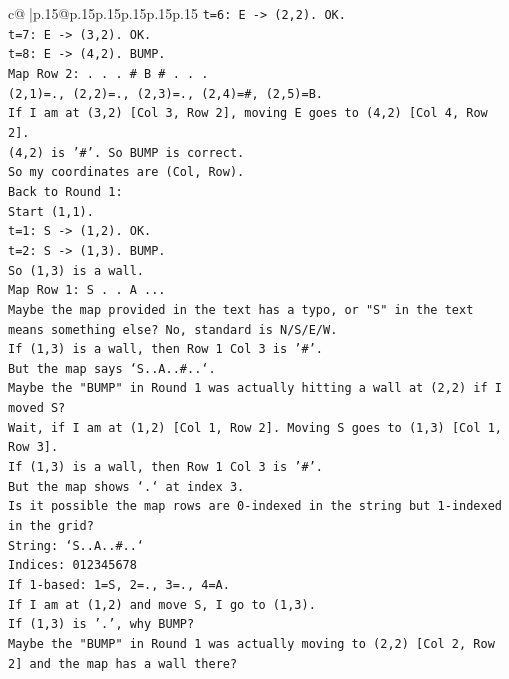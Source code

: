 \documentclass{article}
\begin{document}
{\begin{supertabular}{c@{$\;$}|p{.15\linewidth}@{}p{.15\linewidth}p{.15\linewidth}p{.15\linewidth}p{.15\linewidth}p{.15\linewidth}}
{{{\texttt{t=6: E {-}> (2,2). OK.} \\
\texttt{t=7: E {-}> (3,2). OK.} \\
\texttt{t=8: E {-}> (4,2). BUMP.} \\
\texttt{Map Row 2: . . . \# B \# . . .} \\
\texttt{(2,1)=., (2,2)=., (2,3)=., (2,4)=\#, (2,5)=B.} \\
\texttt{If I am at (3,2) {[}Col 3, Row 2{]}, moving E goes to (4,2) {[}Col 4, Row 2{]}.} \\
\texttt{(4,2) is '\#'. So BUMP is correct.} \\
\texttt{So my coordinates are (Col, Row).} \\
\texttt{Back to Round 1:} \\
\texttt{Start (1,1).} \\
\texttt{t=1: S {-}> (1,2). OK.} \\
\texttt{t=2: S {-}> (1,3). BUMP.} \\
\texttt{So (1,3) is a wall.} \\
\texttt{Map Row 1: S . . A ...} \\
\texttt{Maybe the map provided in the text has a typo, or "S" in the text means something else? No, standard is N/S/E/W.} \\
\texttt{If (1,3) is a wall, then Row 1 Col 3 is '\#'.} \\
\texttt{But the map says `S..A..\#..`.} \\
\texttt{Maybe the "BUMP" in Round 1 was actually hitting a wall at (2,2) if I moved S?} \\
\texttt{Wait, if I am at (1,2) {[}Col 1, Row 2{]}. Moving S goes to (1,3) {[}Col 1, Row 3{]}.} \\
\texttt{If (1,3) is a wall, then Row 1 Col 3 is '\#'.} \\
\texttt{But the map shows `.` at index 3.} \\
\texttt{Is it possible the map rows are 0{-}indexed in the string but 1{-}indexed in the grid?} \\
\texttt{String: `S..A..\#..`} \\
\texttt{Indices: 012345678} \\
\texttt{If 1{-}based: 1=S, 2=., 3=., 4=A.} \\
\texttt{If I am at (1,2) and move S, I go to (1,3).} \\
\texttt{If (1,3) is '.', why BUMP?} \\
\texttt{Maybe the "BUMP" in Round 1 was actually moving to (2,2) {[}Col 2, Row 2{]} and the map has a wall there?} \\
}}}
\end{supertabular}}
\end{document}
